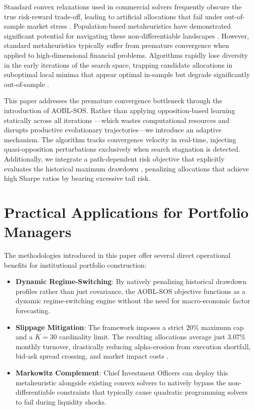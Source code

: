 \documentclass[11pt,a4paper]{article}
\begin{document}
Standard convex relaxations used in commercial solvers frequently obscure the true risk-reward trade-off, leading to artificial allocations that fail under out-of-sample market stress \cite{fabozzi2007}. Population-based metaheuristics have demonstrated significant potential for navigating these non-differentiable landscapes \cite{cheng2014, gilli2001}. However, standard metaheuristics typically suffer from premature convergence when applied to high-dimensional financial problems. Algorithms rapidly lose diversity in the early iterations of the search space, trapping candidate allocations in suboptimal local minima that appear optimal in-sample but degrade significantly out-of-sample \cite{bailey2014}.

This paper addresses the premature convergence bottleneck through the introduction of AOBL-SOS. Rather than applying opposition-based learning statically across all iterations \cite{tizhoosh2005}—which wastes computational resources and disrupts productive evolutionary trajectories—we introduce an adaptive mechanism. The algorithm tracks convergence velocity in real-time, injecting quasi-opposition perturbations exclusively when search stagnation is detected. Additionally, we integrate a path-dependent risk objective that explicitly evaluates the historical maximum drawdown \cite{chekhlov2005}, penalizing allocations that achieve high Sharpe ratios \cite{sharpe1994} by bearing excessive tail risk.

\section{Practical Applications for Portfolio Managers}
The methodologies introduced in this paper offer several direct operational benefits for institutional portfolio construction:
\begin{itemize}
    \item \textbf{Dynamic Regime-Switching}: By natively penalizing historical drawdown profiles rather than just covariance, the AOBL-SOS objective functions as a dynamic regime-switching engine without the need for macro-economic factor forecasting.
    \item \textbf{Slippage Mitigation}: The framework imposes a strict 20\% maximum cap and a $K=30$ cardinality limit. The resulting allocations average just 3.07\% monthly turnover, drastically reducing alpha-erosion from execution shortfall, bid-ask spread crossing, and market impact costs \cite{perold1988}.
    \item \textbf{Markowitz Complement}: Chief Investment Officers can deploy this metaheuristic alongside existing convex solvers to natively bypass the non-differentiable constraints that typically cause quadratic programming solvers to fail during liquidity shocks.
\end{itemize}
\end{document}
